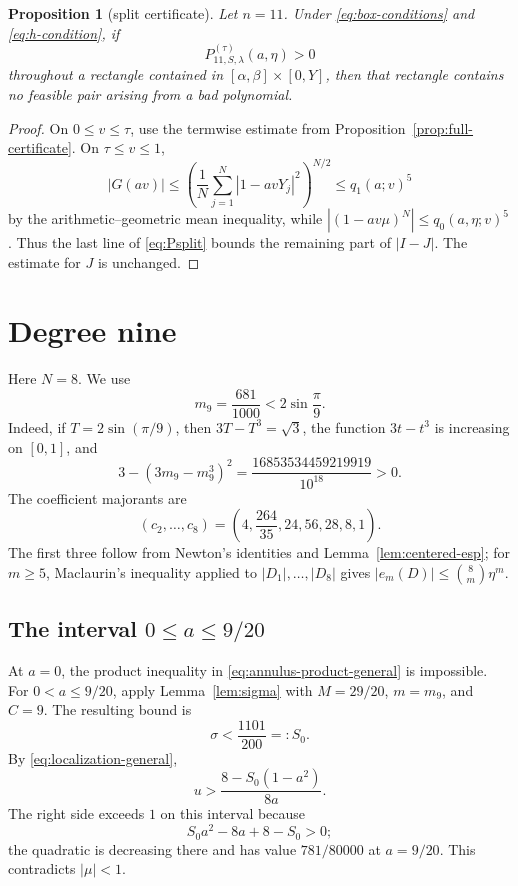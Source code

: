 \documentclass[11pt]{article}
\newtheorem{proposition}[theorem]{Proposition}
\theoremstyle{remark}
\begin{document}
\begin{proposition}[split certificate]\label{prop:split-certificate}
Let $n=11$.  Under \eqref{eq:box-conditions} and
\eqref{eq:h-condition}, if
\[
 P_{11,S,\lambda}^{(\tau)}(a,\eta)>0
\]
throughout a rectangle contained in
$[\alpha,\beta]\times[0,Y]$, then that rectangle contains no feasible pair
arising from a bad polynomial.
\end{proposition}

\begin{proof}
On $0\le v\le\tau$, use the termwise estimate from
Proposition~\ref{prop:full-certificate}.  On $\tau\le v\le1$,
\[
 |G(av)|
 \le\left(\frac1N\sum_{j=1}^N|1-avY_j|^2\right)^{N/2}
 \le q_1(a;v)^5
\]
by the arithmetic--geometric mean inequality, while
$|(1-av\mu)^N|\le q_0(a,\eta;v)^5$.  Thus the last line of
\eqref{eq:Psplit} bounds the remaining part of $|I-J|$.  The estimate for
$J$ is unchanged.
\end{proof}

\section{Degree nine}

Here $N=8$.  We use
\[
 m_9=\frac{681}{1000}<2\sin\frac\pi9.
\]
Indeed, if $T=2\sin(\pi/9)$, then $3T-T^3=\sqrt3$, the function
$3t-t^3$ is increasing on $[0,1]$, and
\[
 3-(3m_9-m_9^3)^2
 =\frac{16853534459219919}{10^{18}}>0.
\]
The coefficient majorants are
\begin{equation}\label{eq:c9}
 (c_2,\ldots,c_8)=
 \left(4,\frac{264}{35},24,56,28,8,1\right).
\end{equation}
The first three follow from Newton's identities and
Lemma~\ref{lem:centered-esp}; for $m\ge5$, Maclaurin's inequality applied to
$|D_1|,\ldots,|D_8|$ gives $|e_m(D)|\le\binom8m\eta^m$.

\subsection{The interval $0\le a\le9/20$}

At $a=0$, the product inequality in
\eqref{eq:annulus-product-general} is impossible.  For
$0<a\le9/20$, apply Lemma~\ref{lem:sigma} with
$M=29/20$, $m=m_9$, and $C=9$.  The resulting bound is
\[
 \sigma<\frac{1101}{200}=:S_0.
\]
By \eqref{eq:localization-general},
\[
 u>\frac{8-S_0(1-a^2)}{8a}.
\]
The right side exceeds $1$ on this interval because
\[
 S_0a^2-8a+8-S_0>0;
\]
the quadratic is decreasing there and has value $781/80000$ at $a=9/20$.
This contradicts $|\mu|<1$.
\end{document}
